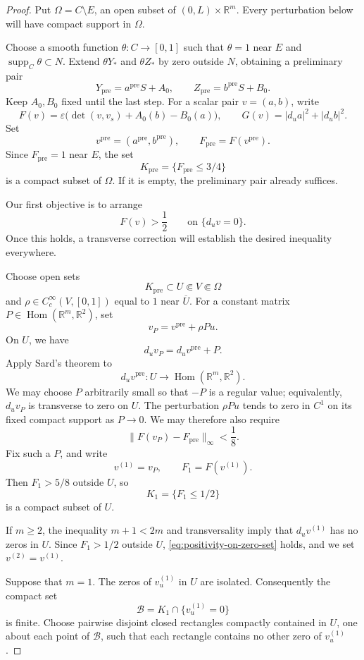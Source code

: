 \documentclass[11pt]{article}
\theoremstyle{remark}
\begin{document}
\begin{proof}
Put $\Omega=C\setminus E$, an open subset of
$(0,L)\times\mathbb R^m$. Every perturbation below will have compact
support in $\Omega$.

Choose a smooth function $\theta:C\to[0,1]$ such that
$\theta=1$ near $E$ and
$\operatorname{supp}_{C}\theta\subset N$.
Extend $\theta Y_*$ and $\theta Z_*$ by zero outside $N$, obtaining
a preliminary pair
$$
  Y_{\mathrm{pre}}=a^{\mathrm{pre}}S+A_0,
  \qquad
  Z_{\mathrm{pre}}=b^{\mathrm{pre}}S+B_0.
$$
Keep $A_0,B_0$ fixed until the last step. For a scalar pair $v=(a,b)$,
write
$$
  F(v)
  =\varepsilon\bigl(\det(v,v_s)+A_0(b)-B_0(a)\bigr),
  \qquad
  G(v)=|d_ua|^2+|d_ub|^2.
$$
Set
$$
  v^{\mathrm{pre}}=(a^{\mathrm{pre}},b^{\mathrm{pre}}),
  \qquad
  F_{\mathrm{pre}}=F(v^{\mathrm{pre}}).
$$
Since $F_{\mathrm{pre}}=1$ near $E$, the set
$$
  K_{\mathrm{pre}}=\{F_{\mathrm{pre}}\leq 3/4\}
$$
is a compact subset of $\Omega$. If it is empty, the preliminary
pair already suffices.

Our first objective is to arrange
\begin{equation}\label{eq:positivity-on-zero-set}\tag{4.2}
  F(v)>\frac12
  \qquad\text{on }\{d_uv=0\}.
\end{equation}
Once this holds, a transverse correction will establish the desired inequality everywhere.

Choose open sets
$$
  K_{\mathrm{pre}}\subset U\Subset V\Subset\Omega
$$
and $\rho\in C_c^\infty(V,[0,1])$ equal to $1$ near $\overline U$. For a constant matrix
$P\in\operatorname{Hom}(\mathbb R^m,\mathbb R^2)$, set
$$
  v_P=v^{\mathrm{pre}}+\rho Pu.
$$
On $U$, we have
$$
  d_uv_P=d_uv^{\mathrm{pre}}+P.
$$
Apply Sard's theorem to
$$
  d_uv^{\mathrm{pre}}:
  U\longrightarrow\operatorname{Hom}(\mathbb R^m,\mathbb R^2).
$$
We may choose $P$ arbitrarily small so that $-P$ is a regular value; equivalently, $d_uv_P$ is transverse to zero on $U$. The perturbation $\rho Pu$ tends to zero in $C^1$ on its fixed compact support as $P\to0$. We may therefore also require
$$
  \|F(v_P)-F_{\mathrm{pre}}\|_\infty<\frac18.
$$
Fix such a $P$, and write
$$
  v^{(1)}=v_P,
  \qquad
  F_1=F(v^{(1)}).
$$
Then $F_1>5/8$ outside $U$, so
$$
  K_1=\{F_1\leq1/2\}
$$
is a compact subset of $U$.

If $m\geq2$, the inequality $m+1<2m$ and transversality imply that $d_uv^{(1)}$ has no zeros in $U$. Since $F_1>1/2$ outside $U$, \eqref{eq:positivity-on-zero-set} holds, and we set $v^{(2)}=v^{(1)}$.

Suppose that $m=1$. The zeros of $v^{(1)}_u$ in $U$ are isolated. Consequently the compact set
$$
  \mathcal B=K_1\cap\{v^{(1)}_u=0\}
$$
is finite. Choose pairwise disjoint closed rectangles compactly contained in $U$, one about each point of $\mathcal B$, such that each rectangle contains no other zero of $v^{(1)}_u$.


\end{proof}
\end{document}

